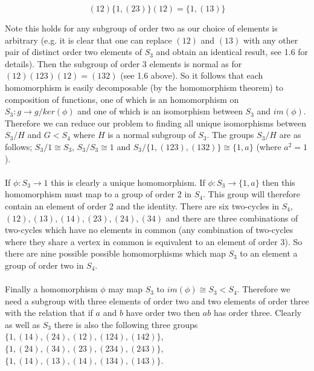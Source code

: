 \documentclass{article}
\begin{document}
\begin{equation*}
	(12)\{1,(23)\}(12) = \{1, (13)\} 
\end{equation*}

Note this holds for any subgroup of order two as our choice of elements is arbitrary (e.g. it is clear 
that one can replace $(12)$ and $(13)$ with any other pair of distinct order two elements of $S_3$ and 
obtain an identical result, see 1.6 for details). Then the 
subgroup of order 3 elements is normal as for $(12)(123)(12) = (132)$ (see 1.6 above). So it follows that each 
homomorphism is easily decomposable (by the homomorphism theorem) to composition of functions, 
one of which is an homomorphism on $S_3: g \rightarrow g/ker(\phi)$ and one of which is an isomorphism 
between $S_3$ and $im(\phi)$. Therefore we can reduce our problem to finding all unique isomorphisms 
between $S_3/H$ and $G < S_4$ where $H$ is a normal subgroup of $S_3$. The groups $S_3/H$ are as 
follows; $S_3/1 \cong S_3$, $S_3/S_3 \cong 1$ and $S_3/\{1, (123), (132)\} \cong \{1, a\}$ (where $a^2 = 1$). 

\paragraph{}
If $\phi: S_3 \rightarrow 1$ this is clearly a unique homomorphism. If $\phi : S_3 \rightarrow \{1, a\}$ 
then this homomorphism must map to a group of order 2 in $S_4$. This group will therefore contain 
an element of order 2 and the identity. There are six two-cycles in $S_4$, $(12),(13),(14),(23),(24),(34)$ 
and there are three combinations of two-cycles which have no elements in common (any combination of 
two-cycles where they share a vertex in common is equivalent to an element of order 3). So there are 
nine possible possible homomorphisms which map $S_3$ to an element a group of order two in $S_4$. 

\paragraph{}
Finally a homomorphism $\phi$ may map $S_3$ to $im(\phi) \cong S_3 < S_4$. Therefore we 
need a subgroup with three elements of order two and two elements of order three with the relation 
that if $a$ and $b$ have order two then $ab$ has order three. Clearly as well as $S_3$ there is 
also the following three groups $\{1,(14),(24),(12),(124),(142)\}$, $\{1,(24),(34),(23),(234),(243)\}$, 
$\{1,(14),(13),(14),(134),(143)\}$. 
\end{document}
